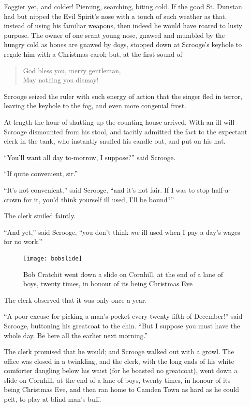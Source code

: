 \documentclass[paper=a5,BCOR=15mm,twoside,DIV=15,headinclude=off,12pt,chapterprefix=off,openany,headings=huge]{scrbook} %
\begin{document}
Foggier yet, and colder! Piercing, searching, biting cold. If the good St. Dunstan had but nipped the Evil Spirit's nose with a touch of such weather as that, instead of using his familiar weapons, then indeed he would have roared to lusty purpose. The owner of one scant young nose, gnawed and mumbled by the hungry cold as bones are gnawed by dogs, stooped down at Scrooge's keyhole to regale him with a Christmas carol; but, at the first sound of 
\blockquote{God bless you, merry gentleman,\\
May nothing you dismay!}

Scrooge seized the ruler with such energy of action that the singer fled in terror, leaving the keyhole to the fog, and even more congenial frost.

At length the hour of shutting up the counting-house arrived. With an ill-will Scrooge dismounted from his stool, and tacitly admitted the fact to the expectant clerk in the tank, who instantly snuffed his candle out, and put on his hat.

\enquote{You'll want all day to-morrow, I suppose?} said Scrooge.

\enquote{If quite convenient, sir.}

\enquote{It's not convenient,} said Scrooge, \enquote{and it's not fair. If I was to stop half-a-crown for it, you'd think yourself ill used, I'll be bound?}

The clerk smiled faintly.

\enquote{And yet,} said Scrooge, \enquote{you don't think \textit{me} ill used when I pay a day's wages for no work.}

\begin{figure}[p]
\begin{minipage}[c]{\linewidth}
\texttt{[image: bobslide]}
\caption*{ Bob Cratchit went down a slide on Cornhill, at the end of a lane of boys, twenty times, in honour of its being Christmas Eve}
\end{minipage}
\end{figure}

The clerk observed that it was only once a year.

\enquote{A poor excuse for picking a man's pocket every twenty-fifth of December!} said Scrooge, buttoning his greatcoat to the chin. \enquote{But I suppose you must have the whole day. Be here all the earlier next morning.}

The clerk promised that he would; and Scrooge walked out with a growl. The office was closed in a twinkling, and the clerk, with the long ends of his white comforter dangling below his waist (for he boasted no greatcoat), went down a slide on Cornhill, at the end of a lane of boys, twenty times, in honour of its being Christmas Eve, and then ran home to Camden Town as hard as he could pelt, to play at blind man's-buff.
\end{document}
